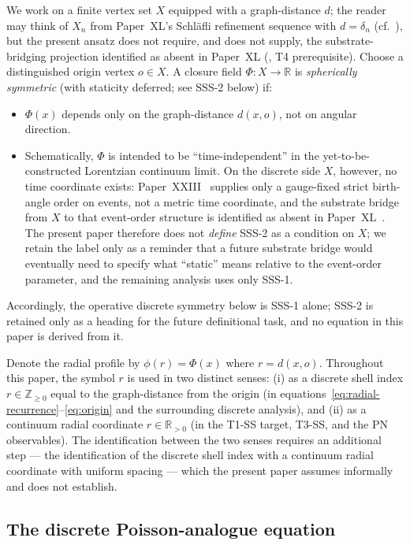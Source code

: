 \documentclass[12pt]{article}
\theoremstyle{definition}
\theoremstyle{remark}
\begin{document}
We work on a finite vertex set $X$ equipped with a graph-distance $d$; the reader may think of $X_n$ from Paper~XL's Schl\"afli refinement sequence with $d = \delta_n$ (cf.~\citep{SmartXL}), but the present ansatz does not require, and does not supply, the substrate-bridging projection identified as absent in Paper~XL (\citealt{SmartXL}, T4 prerequisite). Choose a distinguished origin vertex $o \in X$. A closure field $\Phi : X \to \mathbb{R}$ is \emph{spherically symmetric} (with staticity deferred; see SSS-2 below) if:
\begin{itemize}
\item[(SSS-1)] $\Phi(x)$ depends only on the graph-distance $d(x, o)$, not on angular direction.
\item[(SSS-2)] Schematically, $\Phi$ is intended to be ``time-independent'' in the yet-to-be-constructed Lorentzian continuum limit. On the discrete side $X$, however, no time coordinate exists: Paper~XXIII~\citep{SmartXXIII} supplies only a gauge-fixed strict birth-angle order on events, not a metric time coordinate, and the substrate bridge from $X$ to that event-order structure is identified as absent in Paper~XL~\citep{SmartXL}. The present paper therefore does not \emph{define} SSS-2 as a condition on $X$; we retain the label only as a reminder that a future substrate bridge would eventually need to specify what ``static'' means relative to the event-order parameter, and the remaining analysis uses only SSS-1.
\end{itemize}
Accordingly, the operative discrete symmetry below is SSS-1 alone; SSS-2 is retained only as a heading for the future definitional task, and no equation in this paper is derived from it.

Denote the radial profile by $\phi(r) = \Phi(x)$ where $r = d(x, o)$. Throughout this paper, the symbol $r$ is used in two distinct senses: (i) as a discrete shell index $r \in \mathbb{Z}_{\geq 0}$ equal to the graph-distance from the origin (in equations~\eqref{eq:radial-recurrence}--\eqref{eq:origin} and the surrounding discrete analysis), and (ii) as a continuum radial coordinate $r \in \mathbb{R}_{>0}$ (in the T1-SS target, T3-SS, and the PN observables). The identification between the two senses requires an additional step --- the identification of the discrete shell index with a continuum radial coordinate with uniform spacing --- which the present paper assumes informally and does not establish.

\subsection{The discrete Poisson-analogue equation}
\end{document}
